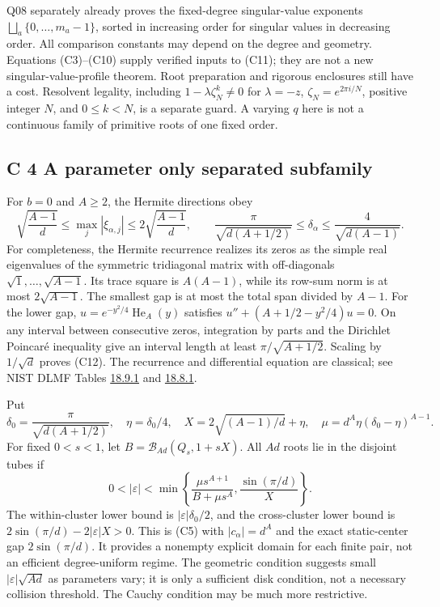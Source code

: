 \documentclass[
  11pt,
]{article}
\begin{document}
Q08 separately already proves the fixed-degree singular-value exponents
\(\bigsqcup_a\{0,\ldots,m_a-1\}\), sorted in increasing order for
singular values in decreasing order. All comparison constants may
depend on the degree and geometry. Equations (C3)--(C10) supply verified
inputs to (C11); they are not a new singular-value-profile theorem.
Root preparation and rigorous enclosures still have a cost. Resolvent
legality, including \(1-\lambda\zeta_N^k\ne0\) for
\(\lambda=-z\), \(\zeta_N=e^{2\pi i/N}\), positive integer \(N\),
and \(0\leq k<N\), is a separate guard. A varying \(q\) here is not
a continuous family of primitive roots of one fixed order.

\subsection{C 4 A parameter only separated subfamily}

For \(b=0\) and \(A\geq2\), the Hermite directions obey
\[
\sqrt{\frac{A-1}{d}}\leq\max_j|\xi_{\alpha,j}|
\leq2\sqrt{\frac{A-1}{d}},\qquad
\frac{\pi}{\sqrt{d(A+1/2)}}\leq\delta_\alpha
\leq\frac4{\sqrt{d(A-1)}}. \tag{C12}
\]
For completeness, the Hermite recurrence realizes its zeros as the
simple real eigenvalues of the symmetric tridiagonal matrix with
off-diagonals \(\sqrt1,\ldots,\sqrt{A-1}\). Its trace square is
\(A(A-1)\), while its row-sum norm is at most \(2\sqrt{A-1}\).
The smallest gap is at most the total span divided by \(A-1\).
For the lower gap, \(u=e^{-y^2/4}\operatorname{He}_A(y)\) satisfies
\(u''+(A+1/2-y^2/4)u=0\). On any interval between consecutive zeros,
integration by parts and the Dirichlet Poincar\'e inequality give an
interval length at least \(\pi/\sqrt{A+1/2}\). Scaling by
\(1/\sqrt d\) proves (C12). The recurrence and differential equation
are classical; see NIST DLMF Tables
\href{https://dlmf.nist.gov/18.9.T1}{18.9.1} and
\href{https://dlmf.nist.gov/18.8.T1}{18.8.1}.

Put
\[
\delta_0=\frac\pi{\sqrt{d(A+1/2)}},\quad
\eta=\delta_0/4,\quad X=2\sqrt{(A-1)/d}+\eta,\quad
\mu=d^A\eta(\delta_0-\eta)^{A-1}.
\]
For fixed \(0<s<1\), let \(B=\mathcal B_{Ad}(Q_s,1+sX)\).
All \(Ad\) roots lie in the disjoint tubes if
\[
0<|\varepsilon|<
\min\left\{\frac{\mu s^{A+1}}{B+\mu s^A},
\frac{\sin(\pi/d)}X\right\}. \tag{C13}
\]
The within-cluster lower bound is
\(|\varepsilon|\delta_0/2\), and the cross-cluster lower bound is
\(2\sin(\pi/d)-2|\varepsilon|X>0\). This is (C5) with
\(|c_\alpha|=d^A\) and the exact static-center gap
\(2\sin(\pi/d)\). It provides a nonempty explicit domain for each
finite pair, not an efficient degree-uniform regime. The geometric
condition suggests small \(|\varepsilon|\sqrt{Ad}\) as parameters
vary; it is only a sufficient disk condition, not a necessary collision
threshold. The Cauchy condition may be much more restrictive.
\end{document}
